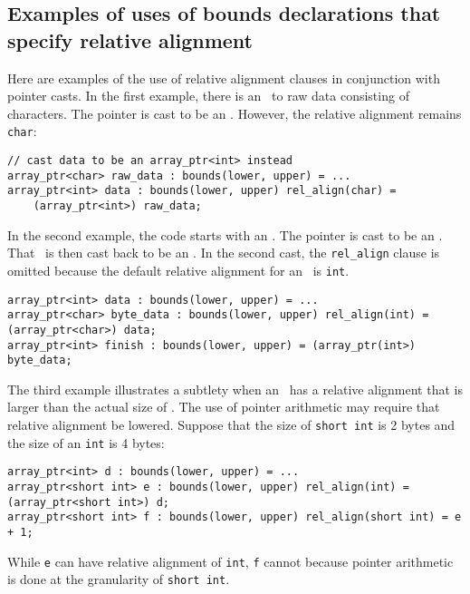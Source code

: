 \subsection{Examples of uses of bounds declarations that specify relative alignment}

Here are examples of the use of relative alignment clauses in
conjunction with pointer casts. In the first example, there is an
\arrayptr\ to raw data consisting of characters. The pointer is
cast to be an \arrayptrint . However,
the relative alignment remains \texttt{char}:

\begin{verbatim}
// cast data to be an array_ptr<int> instead
array_ptr<char> raw_data : bounds(lower, upper) = ...
array_ptr<int> data : bounds(lower, upper) rel_align(char) =
    (array_ptr<int>) raw_data;
\end{verbatim}

In the second example, the code starts with an
\arrayptrint. The pointer is cast to
be an \arrayptrchar. That
\arrayptr\ is then cast back to be an
\arrayptrint . In the second cast, the
\texttt{rel\_align} clause is omitted because the default relative
alignment for an \arrayptrint\ is
\texttt{int}.

\begin{verbatim}
array_ptr<int> data : bounds(lower, upper) = ...
array_ptr<char> byte_data : bounds(lower, upper) rel_align(int) = (array_ptr<char>) data;
array_ptr<int> finish : bounds(lower, upper) = (array_ptr(int>) byte_data;
\end{verbatim}

The third example illustrates a subtlety when an
\arrayptrT\ has a
relative alignment that is larger than the actual size of . The
use of pointer arithmetic may require that relative alignment be
lowered. Suppose that the size of \texttt{short int} is 2 bytes and the
size of an \texttt{int} is 4 bytes:

\begin{verbatim}
array_ptr<int> d : bounds(lower, upper) = ...
array_ptr<short int> e : bounds(lower, upper) rel_align(int) = (array_ptr<short int>) d;
array_ptr<short int> f : bounds(lower, upper) rel_align(short int) = e + 1;
\end{verbatim}

While \texttt{e} can have relative alignment of \texttt{int}, \texttt{f}
cannot because pointer arithmetic is done at the granularity of
\texttt{short int}.


